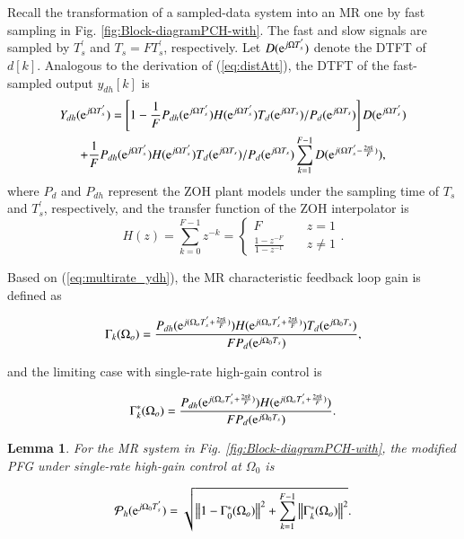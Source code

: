 \documentclass [11pt, proquest] {uwthesis}[2020/02/24]
\newtheorem{lemma}{Lemma}
\begin{document}
Recall the transformation of a sampled-data system into an MR one
by fast sampling in Fig. \ref{fig:Block-diagramPCH-with}. The fast
and slow signals are sampled by $T_{s}^{'}$ and $T_{s}=FT_{s}^{'}$,
respectively. Let $D(\text{\ensuremath{\mathrm{e}}}^{j\Omega T_{s}^{'}})$
denote the DTFT of $d[k]$. Analogous to the derivation of (\ref{eq:distAtt}),
the DTFT of the fast-sampled output $y_{dh}[k]$ \cite{oomen2007design}
is \emph{\scriptsize{}
\begin{multline}
Y_{dh}(\text{\ensuremath{\mathrm{e}}}^{j\Omega T_{s}^{'}})=\left[1-\frac{1}{F}P_{dh}(\text{\ensuremath{\mathrm{e}}}^{j\Omega T_{s}^{'}})H(\text{\ensuremath{\mathrm{e}}}^{j\Omega T_{s}^{'}})T_{d}(\mathrm{e}^{j\Omega T_{s}})/P_{d}(\mathrm{e}^{j\Omega T_{s}})\right]D(\mathrm{e}^{j\Omega T_{s}^{'}})\\
+\frac{1}{F}P_{dh}(\text{\ensuremath{\mathrm{e}}}^{j\Omega T_{s}^{'}})H(\text{\ensuremath{\mathrm{e}}}^{j\Omega T_{s}^{'}})T_{d}(\mathrm{e}^{j\Omega T_{s}})/P_{d}(\mathrm{e}^{j\Omega T_{s}})\sum_{k=1}^{F-1}D(\mathrm{e}^{j(\Omega T_{s}^{'}-\frac{2\pi k}{F})}),\label{eq:multirate_ydh}
\end{multline}
}where $P_{d}$ and $P_{dh}$ represent the ZOH plant models under
the sampling time of $T_{s}$ and $T_{s}^{'}$, respectively, and
the transfer function of the ZOH interpolator is\emph{
\begin{equation}
H(z)=\sum_{k=0}^{F-1}z^{-k}=\begin{cases}
F & \quad z=1\\
\frac{1-z^{-F}}{1-z^{-1}} & \quad z\neq1
\end{cases}.\label{ZOH}
\end{equation}
}

Based on (\ref{eq:multirate_ydh}), the MR characteristic feedback
loop gain is defined as

\begin{equation}
\Gamma_{k}(\Omega_{o})=\frac{P_{dh}(\mathrm{e}^{j(\Omega_{o}T_{s}^{'}+\frac{2\pi k}{F})})H(\mathrm{e}^{j(\Omega_{o}T_{s}^{'}+\frac{2\pi k}{F})})T_{d}(\mathrm{e}^{j\Omega_{0}T_{s}})}{FP_{d}(\mathrm{e}^{j\Omega_{0}T_{s}})},\label{eq:Gammk_multirate-1}
\end{equation}

\noindent and the limiting case with single-rate high-gain control
is

\begin{equation}
\Gamma_{k}^{*}(\Omega_{o})=\frac{P_{dh}(\mathrm{e}^{j(\Omega_{o}T_{s}^{'}+\frac{2\pi k}{F})})H(\mathrm{e}^{j(\Omega_{o}T_{s}^{'}+\frac{2\pi k}{F})})}{FP_{d}(\mathrm{e}^{j\Omega_{0}T_{s}})}.\label{eq:Gammk_multirate}
\end{equation}
\begin{lemma}\label{For-the-MR}For the MR system in Fig. \ref{fig:Block-diagramPCH-with},
the modified PFG under single-rate high-gain control at $\Omega_{0}$
is

\begin{equation}
\mathcal{P}_{h}(\mathrm{e}^{j\Omega_{0}T_{s}^{'}})=\sqrt{\left\Vert 1-\Gamma_{0}^{*}(\Omega_{o})\right\Vert ^{2}+\sum_{k=1}^{F-1}\left\Vert \Gamma_{k}^{*}(\Omega_{o})\right\Vert ^{2}}.\label{eq:PFR DOB}
\end{equation}
\end{lemma}
\end{document}
